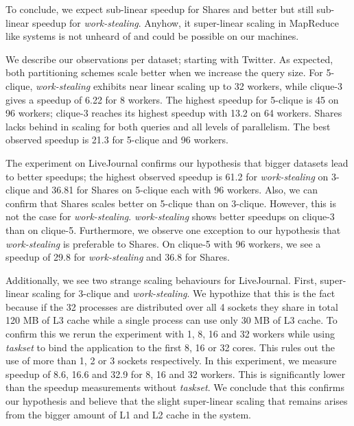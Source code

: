To conclude, we expect sub-linear speedup for Shares and better but still sub-linear speedup for \textit{work-stealing}.
Anyhow, it super-linear scaling in MapReduce like systems is not unheard of and could be possible on our machines.

We describe our observations per dataset; starting with Twitter.
As expected, both partitioning schemes scale better when we increase the query size.
For 5-clique, \textit{work-stealing} exhibits near linear scaling up to 32 workers, while
clique-3 gives a speedup of 6.22 for 8 workers.
The highest speedup for 5-clique is 45 on 96 workers; clique-3 reaches its highest speedup
with 13.2 on 64 workers.
Shares lacks behind in scaling for both queries and all levels of parallelism.
The best observed speedup is 21.3 for 5-clique and 96 workers.

The experiment on LiveJournal confirms our hypothesis that bigger datasets lead to better
speedups;
the highest observed speedup is 61.2 for \textit{work-stealing} on 3-clique and
36.81 for Shares on 5-clique each with 96 workers.
Also, we can confirm that Shares scales better on 5-clique than on 3-clique.
However, this is not the case for \textit{work-stealing}.
\textit{work-stealing} shows better speedups on clique-3 than on clique-5.
Furthermore, we observe one exception to our hypothesis that \textit{work-stealing}
is preferable to Shares.
On clique-5 with 96 workers, we see a speedup of 29.8 for \textit{work-stealing} and 36.8
for Shares.

Additionally, we see two strange scaling behaviours for LiveJournal.
First, super-linear scaling for 3-clique and \textit{work-stealing}.
We hypothize that this is the fact because if the 32 processes are distributed over all 4 sockets they share in total
120 MB of L3 cache while a single process can use only 30 MB of L3 cache.
To confirm this we rerun the experiment with 1, 8, 16 and 32 workers while using \textit{taskset} to bind the application
to the first 8, 16 or 32 cores.
This rules out the use of more than 1, 2 or 3 sockets respectively.
In this experiment, we measure speedup of 8.6, 16.6 and 32.9 for 8, 16 and 32 workers.
This is significantly lower than the speedup measurements without \textit{taskset}.
We conclude that this confirms our hypothesis and believe that the slight super-linear
scaling that remains arises from the bigger amount of L1 and L2 cache in the system.

